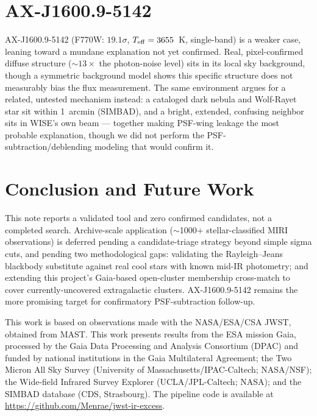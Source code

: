 \documentclass[RNAAS]{aastex7}
\begin{document}
\section{AX-J1600.9-5142}

AX-J1600.9-5142 (F770W: $19.1\sigma$, $T_{\rm eff}=3655$~K,
single-band) is a weaker case, leaning toward a mundane explanation
not yet confirmed. Real, pixel-confirmed diffuse
structure ($\sim13\times$ the photon-noise level) sits in its local
sky background, though a symmetric background model shows this
specific structure does not measurably bias the flux measurement. The
same environment argues for a related, untested mechanism instead: a
cataloged dark nebula and Wolf-Rayet star sit within 1~arcmin
(SIMBAD), and a bright, extended, confusing neighbor sits in WISE's
own beam --- together making PSF-wing leakage the most probable
explanation, though we did not perform the PSF-subtraction/deblending
modeling that would confirm it.

\section{Conclusion and Future Work}

This note reports a validated tool and zero confirmed candidates, not
a completed search. Archive-scale application ($\sim$1000+
stellar-classified MIRI observations) is deferred pending a
candidate-triage strategy beyond simple sigma cuts, and pending two
methodological gaps: validating the Rayleigh--Jeans blackbody
substitute against real cool stars with known mid-IR photometry; and
extending this project's Gaia-based open-cluster membership
cross-match \citep{CantatGaudin2020} to cover currently-uncovered
extragalactic clusters. AX-J1600.9-5142 remains the more promising
target for confirmatory PSF-subtraction follow-up.


\begin{acknowledgments}
This work is based on observations made with the NASA/ESA/CSA JWST,
obtained from MAST. This work presents results from the ESA mission
Gaia, processed by the Gaia Data Processing and Analysis Consortium
(DPAC) and funded by national institutions in the Gaia Multilateral
Agreement; the Two Micron All Sky Survey (University of
Massachusetts/IPAC-Caltech; NASA/NSF); the Wide-field Infrared Survey
Explorer (UCLA/JPL-Caltech; NASA); and the SIMBAD database (CDS,
Strasbourg). The pipeline code is available at
\url{https://github.com/Menrae/jwst-ir-excess}.
\end{acknowledgments}
\end{document}
